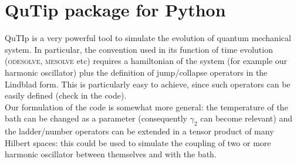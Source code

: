 \documentclass[11pt,letterpaper]{article}
\begin{document}
\section{QuTip package for Python}
QuTIp is a very powerful tool to simulate the evolution of quantum mechanical system. In particular, the convention used in its function of time evolution (\textsc{odesolve}, \textsc{mesolve} etc) requires a hamiltonian of the system (for example our harmonic oscillator) plus the definition of jump/collapse operators in the Lindblad form. This is particularly easy to achieve, since such operators can be easily defined (check in the code).\\
Our formulation of the code is somewhat more general: the temperature of the bath can be changed as a parameter (consequently $\gamma_2$ can become relevant) and the ladder/number operators can be extended in a tensor product of many Hilbert spaces: this could be used to simulate the coupling of two or more harmonic oscillator between themselves and with the bath. 
\end{document}
